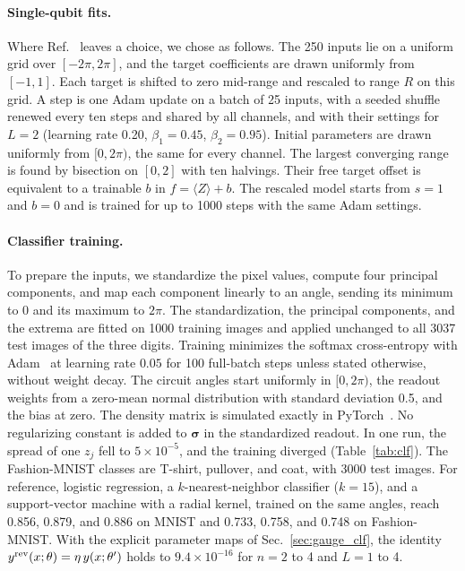 \documentclass[
 aps,pra,
 twocolumn,
 superscriptaddress,
 longbibliography,
 nofootinbib
]{revtex4-2}
\begin{document}
\paragraph{Single-qubit fits.}
Where Ref.~\cite{vanrossum2026biased} leaves a choice, we chose as follows. The
250 inputs lie on a uniform grid over $[-2\pi,2\pi]$, and the target
coefficients are drawn uniformly from $[-1,1]$. Each target is shifted to zero
mid-range and rescaled to range $R$ on this grid. A step is one Adam update on a
batch of 25 inputs, with a seeded shuffle renewed every ten steps and shared by
all channels, and with their settings for $L=2$
(learning rate 0.20, $\beta_1=0.45$, $\beta_2=0.95$). Initial parameters are
drawn uniformly from $[0,2\pi)$, the same for every channel. The largest
converging range is found by bisection on $[0,2]$ with ten halvings. Their free
target offset is equivalent to a trainable
$b$ in $f=\langle Z\rangle+b$. The rescaled model starts from $s=1$ and $b=0$
and is trained for up to 1000 steps with the same Adam settings.

\paragraph{Classifier training.}
To prepare the inputs, we standardize the pixel values, compute four principal
components, and map each component linearly to an angle, sending its minimum
to 0 and its maximum to $2\pi$. The standardization, the principal components,
and the extrema are fitted on 1000 training images and applied unchanged to all
3037 test images of the three digits. Training minimizes the softmax cross-entropy with Adam~\cite{kingma2014adam} at
learning rate $0.05$ for 100 full-batch steps unless stated otherwise, without
weight decay. The circuit angles start uniformly in $[0,2\pi)$, the readout
weights from a zero-mean normal distribution with standard deviation 0.5, and
the bias at zero. The density matrix
is simulated exactly in PyTorch~\cite{paszke2019pytorch}. No regularizing
constant is added to $\boldsymbol\sigma$ in the standardized readout. In one
run, the spread of one $z_j$ fell to $5\times10^{-5}$, and the training diverged
(Table~\ref{tab:clf}). The Fashion-MNIST classes are T-shirt, pullover, and
coat, with 3000 test images. For reference, logistic regression, a
$k$-nearest-neighbor classifier ($k=15$), and a support-vector machine with a
radial kernel, trained on the same angles, reach 0.856, 0.879, and 0.886 on
MNIST and 0.733, 0.758, and 0.748 on Fashion-MNIST. With the explicit parameter maps of
Sec.~\ref{sec:gauge_clf}, the identity $y^{\rm rev}(x;\theta)=\eta\,y(x;\theta')$
holds to $9.4\times10^{-16}$ for $n=2$ to 4 and $L=1$ to 4.
\end{document}
